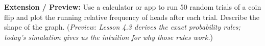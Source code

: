 \documentclass[10pt]{article}
\begin{document}
\begin{practicebox}
\vspace{8pt}
\textbf{Extension / Preview:} Use a calculator or app to run 50 random trials of a
coin flip and plot the running relative frequency of heads after each trial. Describe
the shape of the graph. (\textit{Preview: Lesson 4.3 derives the exact probability
rules; today's simulation gives us the intuition for why those rules work.})

\end{practicebox}
\end{document}
